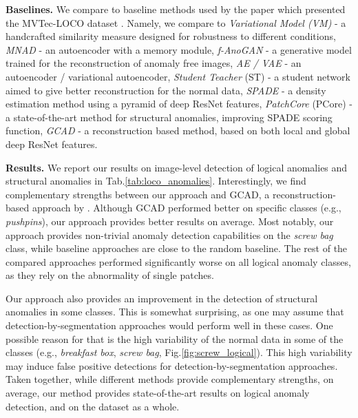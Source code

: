 \documentclass{article}
\begin{document}
\textbf{Baselines.} We compare to baseline methods used by the paper which presented the MVTec-LOCO dataset \cite{bergmann2022beyond}. Namely, we compare to \textit{Variational Model (VM)} \cite{steger2001similarity} - a handcrafted similarity measure designed for robustness to different conditions, \textit{MNAD} \cite{park2020learning} - an autoencoder with a memory module, \textit{f-AnoGAN} \cite{schlegl2017unsupervised} - a generative model trained for the reconstruction of anomaly free images, \textit{AE / VAE} \cite{sakurada2014anomaly} - an autoencoder / variational autoencoder, \textit{Student Teacher} (ST) \cite{bergmann2020uninformed} - a student network aimed to give better reconstruction for the normal data,  \textit{SPADE} \cite{cohen2020sub} - a density estimation method using a pyramid of deep ResNet features, \textit{PatchCore} (PCore) \cite{roth2022towards} - a state-of-the-art method for structural anomalies, improving SPADE scoring function, \textit{GCAD} \cite{bergmann2022beyond} - a reconstruction based method, based on both local and global deep ResNet features. 

\textbf{Results.} We report our results on image-level detection of logical anomalies and structural anomalies in Tab.\ref{tab:loco_anomalies}. Interestingly, we find complementary strengths between our approach and GCAD, a reconstruction-based approach by \cite{bergmann2022beyond}. Although  GCAD performed better on specific classes (e.g., \textit{pushpins}), our approach provides better results on average.  Most notably, our approach provides non-trivial anomaly detection capabilities on the \textit{screw bag} class, while baseline approaches are close to the random baseline. The rest of the compared approaches performed significantly worse on all logical anomaly classes, as they rely on the abnormality of single patches. 

Our approach also provides an improvement in the detection of structural anomalies in some classes. This is somewhat surprising, as one may assume that detection-by-segmentation approaches would perform well in these cases. One possible reason for that is the high variability of the normal data in some of the classes (e.g., \textit{breakfast box}, \textit{screw bag}, Fig.\ref{fig:screw_logical}). This high variability may induce false positive detections for detection-by-segmentation approaches. Taken together, while different methods provide complementary strengths, on average, our method provides state-of-the-art results on logical anomaly detection, and on the dataset as a whole.
\end{document}

